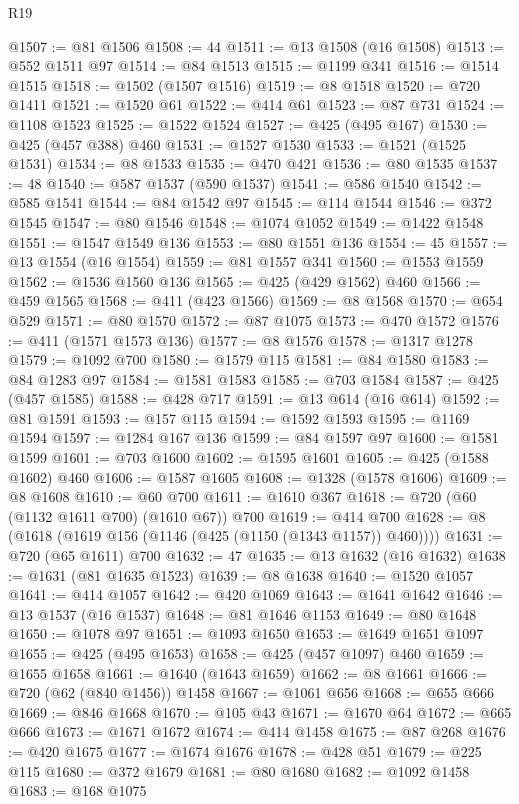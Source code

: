 \begin{lexlean}{R19}
\begin{coremodule}
{{{{{{{{{{{{{{{{{{{{{{{{{{{{{{{{{{{{{{{{{{{{{{{{{{{{{{{{{{{{{{{{{{{{{{{{{{{{{{{{{{{{{{{@1507 := @81 @1506
@1508 := 44
@1511 := @13 @1508 (@16 @1508)
@1513 := @552 @1511 @97
@1514 := @84 @1513
@1515 := @1199 @341
@1516 := @1514 @1515
@1518 := @1502 (@1507 @1516)
@1519 := @8 @1518
@1520 := @720 @1411
@1521 := @1520 @61
@1522 := @414 @61
@1523 := @87 @731
@1524 := @1108 @1523
@1525 := @1522 @1524
@1527 := @425 (@495 @167)
@1530 := @425 (@457 @388) @460
@1531 := @1527 @1530
@1533 := @1521 (@1525 @1531)
@1534 := @8 @1533
@1535 := @470 @421
@1536 := @80 @1535
@1537 := 48
@1540 := @587 @1537 (@590 @1537)
@1541 := @586 @1540
@1542 := @585 @1541
@1544 := @84 @1542 @97
@1545 := @114 @1544
@1546 := @372 @1545
@1547 := @80 @1546
@1548 := @1074 @1052
@1549 := @1422 @1548
@1551 := @1547 @1549 @136
@1553 := @80 @1551 @136
@1554 := 45
@1557 := @13 @1554 (@16 @1554)
@1559 := @81 @1557 @341
@1560 := @1553 @1559
@1562 := @1536 @1560 @136
@1565 := @425 (@429 @1562) @460
@1566 := @459 @1565
@1568 := @411 (@423 @1566)
@1569 := @8 @1568
@1570 := @654 @529
@1571 := @80 @1570
@1572 := @87 @1075
@1573 := @470 @1572
@1576 := @411 (@1571 @1573 @136)
@1577 := @8 @1576
@1578 := @1317 @1278
@1579 := @1092 @700
@1580 := @1579 @115
@1581 := @84 @1580
@1583 := @84 @1283 @97
@1584 := @1581 @1583
@1585 := @703 @1584
@1587 := @425 (@457 @1585)
@1588 := @428 @717
@1591 := @13 @614 (@16 @614)
@1592 := @81 @1591
@1593 := @157 @115
@1594 := @1592 @1593
@1595 := @1169 @1594
@1597 := @1284 @167 @136
@1599 := @84 @1597 @97
@1600 := @1581 @1599
@1601 := @703 @1600
@1602 := @1595 @1601
@1605 := @425 (@1588 @1602) @460
@1606 := @1587 @1605
@1608 := @1328 (@1578 @1606)
@1609 := @8 @1608
@1610 := @60 @700
@1611 := @1610 @367
@1618 := @720 (@60 (@1132 @1611 @700) (@1610 @67)) @700
@1619 := @414 @700
@1628 := @8 (@1618 (@1619 @156 (@1146 (@425 (@1150 (@1343 @1157)) @460))))
@1631 := @720 (@65 @1611) @700
@1632 := 47
@1635 := @13 @1632 (@16 @1632)
@1638 := @1631 (@81 @1635 @1523)
@1639 := @8 @1638
@1640 := @1520 @1057
@1641 := @414 @1057
@1642 := @420 @1069
@1643 := @1641 @1642
@1646 := @13 @1537 (@16 @1537)
@1648 := @81 @1646 @1153
@1649 := @80 @1648
@1650 := @1078 @97
@1651 := @1093 @1650
@1653 := @1649 @1651 @1097
@1655 := @425 (@495 @1653)
@1658 := @425 (@457 @1097) @460
@1659 := @1655 @1658
@1661 := @1640 (@1643 @1659)
@1662 := @8 @1661
@1666 := @720 (@62 (@840 @1456)) @1458
@1667 := @1061 @656
@1668 := @655 @666
@1669 := @846 @1668
@1670 := @105 @43
@1671 := @1670 @64
@1672 := @665 @666
@1673 := @1671 @1672
@1674 := @414 @1458
@1675 := @87 @268
@1676 := @420 @1675
@1677 := @1674 @1676
@1678 := @428 @51
@1679 := @225 @115
@1680 := @372 @1679
@1681 := @80 @1680
@1682 := @1092 @1458
@1683 := @168 @1075
}}}}}}}}}}}}}}}}}}}}}}}}}}}}}}}}}}}}}}}}}}}}}}}}}}}}}}}}}}}}}}}}}}}}}}}}}}}}}}}}}}}}}}}
\end{coremodule}
\end{lexlean}
